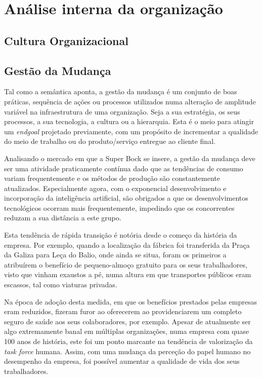 \chapter{Análise interna da organização}
\label{Chapter2} %

\section{Cultura Organizacional}
\section{Gestão da Mudança}
Tal como a semântica aponta, a gestão da mudança é um conjunto de boas práticas, sequência de ações ou processos utilizados numa alteração de amplitude variável na infraestrutura de uma organização. Seja a sua estratégia, os seus processos, a sua tecnologia, a cultura ou a hierarquia. Esta é o meio para atingir um \textit{endgoal} projetado previamente, com um propósito de incrementar a qualidade do meio de trabalho ou do produto/serviço entregue ao cliente final. 

Analisando o mercado em que a Super Bock se insere, a gestão da mudança deve ser uma atividade praticamente contínua dado que as tendências de consumo variam frequentemente e os métodos de produção são constantemente atualizados. Especialmente agora, com o exponencial desenvolvimento e incorporação da inteligência artificial, são obrigados a que os desenvolvimentos tecnológicos ocorram mais frequentemente, impedindo que os concorrentes reduzam a sua distância a este grupo. 

Esta tendência de rápida transição é notória desde o começo da história da empresa. Por exemplo, quando a localização da fábrica foi transferida da Praça da Galiza para Leça do Balio, onde ainda se situa, foram os primeiros a atribuírem o benefício de pequeno-almoço gratuito para os seus trabalhadores, visto que vinham exaustos a pé, numa altura em que transportes públicos eram escassos, tal como viaturas privadas.  

Na época de adoção desta medida, em que os benefícios prestados pelas empresas eram reduzidos, fizeram furor ao oferecerem ao providenciarem um completo seguro de saúde aos seus colaboradores, por exemplo. Apesar de atualmente ser algo extremamente banal em múltiplas organizações, numa empresa com quase 100 anos de história, este foi um ponto marcante na tendência de valorização da \textit{task force} humana. Assim, com uma mudança da perceção do papel humano no desempenho da empresa, foi possível aumentar a qualidade de vida dos seus trabalhadores. 

